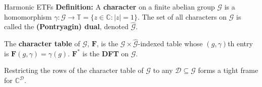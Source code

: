 \documentclass[12pt]{beamer}
\newcommand{\bbC}{\mathbb{C}}
\newcommand{\bbT}{\mathbb{T}}
\newcommand{\bfF}{\mathbf{F}}
\newcommand{\calD}{\mathcal{D}}
\newcommand{\calG}{\mathcal{G}}
\newcommand{\abs}[1]{|{#1}|}
\begin{document}
\begin{frame}{Harmonic ETFs}
\textbf{Definition:} A \textbf{character} on a finite abelian group $\calG$ is a homomorphism $\gamma:\calG\to\bbT=\{z\in\bbC:\abs{z}=1\}$. The set of all characters on $\calG$ is called the \textbf{(Pontryagin) dual}, denoted $\hat{\calG}$.

\vfill

The \textbf{character table} of $\calG$, $\bfF$, is the $\calG\times\hat{\calG}$-indexed table whose $(g,\gamma)$th entry is $\bfF(g,\gamma)=\gamma(g)$. $\bfF^*$ is the \textbf{DFT} on $\calG$.

\vfill

Restricting the rows of the character table of $\calG$ to any $\calD\subseteq\calG$ forms a tight frame for $\bbC^\calD$.
\end{frame}
\end{document}

